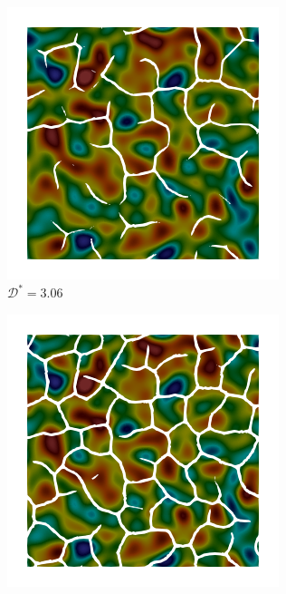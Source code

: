 \begin{figure}[!htbp]
  \begin{subfigure}[b]{0.25\textwidth}
    \includegraphics[width=\textwidth]{Chapter4/figures/2D/psic_sqexp_cartesian_5_5_rho_0_seed_a_with_crack_140.png}
    \caption{$\mathcal{D}^* = 3.06$}
    \label{fig: Chapter4/2D/psic_sqexp_cartesian_5_5_rho_0_seed_a_with_crack_140}
  \end{subfigure}
  \begin{subfigure}[b]{0.25\textwidth}
    \includegraphics[width=\textwidth]{Chapter4/figures/2D/psic_sqexp_cartesian_5_5_rho_0_seed_a_with_crack_160.png}

\end{subfigure}
\end{figure}
